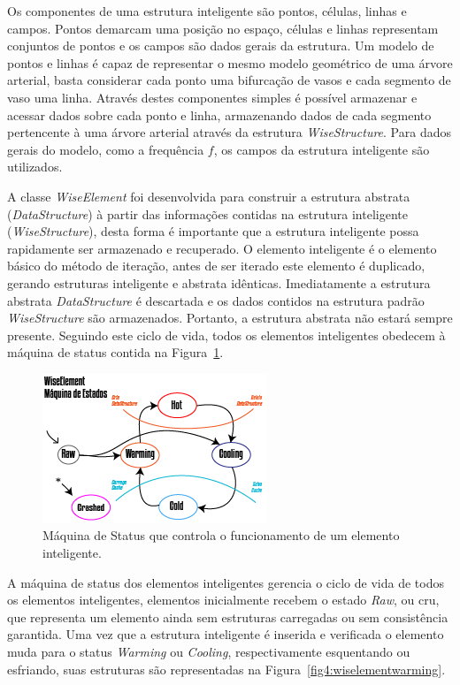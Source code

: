 \documentclass[
        english,			
        brazil			        %
        ,<...>]{abntbibufjf}
\begin{document}
Os componentes de uma estrutura inteligente são pontos, células, linhas e campos. Pontos demarcam uma posição no espaço, células e linhas representam conjuntos de pontos e os campos são dados gerais da estrutura. Um modelo de pontos e linhas é capaz de representar o mesmo modelo geométrico de uma árvore arterial, basta considerar cada ponto uma bifurcação de vasos e cada segmento de vaso uma linha. Através destes componentes simples é possível armazenar e acessar dados sobre cada ponto e linha, armazenando dados de cada segmento pertencente à uma árvore arterial através da estrutura \textit{WiseStructure}. Para dados gerais do modelo, como a frequência $f$, os campos da estrutura inteligente são utilizados.

A classe \textit{WiseElement} foi desenvolvida para construir a estrutura abstrata (\textit{DataStructure}) à partir das informações contidas na estrutura inteligente (\textit{WiseStructure}), desta forma é importante que a estrutura inteligente possa rapidamente ser armazenado e recuperado. O elemento inteligente é o elemento básico do método de iteração, antes de ser iterado este elemento é duplicado, gerando estruturas inteligente e abstrata idênticas. Imediatamente a estrutura abstrata \textit{DataStructure} é descartada e os dados contidos na estrutura padrão \textit{WiseStructure} são armazenados. Portanto, a estrutura abstrata não estará sempre presente. Seguindo este ciclo de vida, todos os elementos inteligentes obedecem à máquina de status contida na Figura~\ref{fig3:wiselementstatus}.

\begin{figure}[!htbp]
	\centering
	\includegraphics[scale=1.5]{Figures/WiseElementStatus.png}
	\caption{Máquina de Status que controla o funcionamento de um elemento inteligente.}
	\label{fig3:wiselementstatus}
\end{figure}

A máquina de status dos elementos inteligentes gerencia o ciclo de vida de todos os elementos inteligentes, elementos inicialmente recebem o estado \textit{Raw}, ou cru, que representa um elemento ainda sem estruturas carregadas ou sem consistência garantida. Uma vez que a estrutura inteligente é inserida e verificada o elemento muda para o status \textit{Warming} ou \textit{Cooling}, respectivamente esquentando ou esfriando, suas estruturas são representadas na Figura~\ref{fig4:wiselementwarming}.
\end{document}
